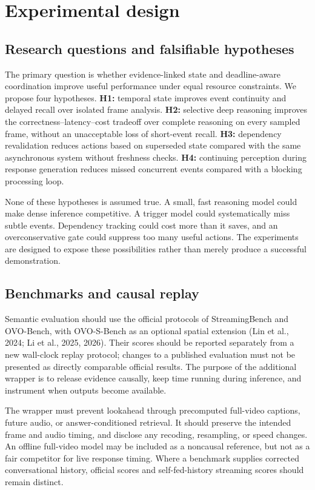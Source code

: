 \documentclass[11pt,letterpaper]{article}
\begin{document}
\section{Experimental design}
\subsection{Research questions and falsifiable hypotheses}
The primary question is whether evidence-linked state and deadline-aware coordination improve useful performance under equal resource constraints. We propose four hypotheses. \textbf{H1:} temporal state improves event continuity and delayed recall over isolated frame analysis. \textbf{H2:} selective deep reasoning improves the correctness--latency--cost tradeoff over complete reasoning on every sampled frame, without an unacceptable loss of short-event recall. \textbf{H3:} dependency revalidation reduces actions based on superseded state compared with the same asynchronous system without freshness checks. \textbf{H4:} continuing perception during response generation reduces missed concurrent events compared with a blocking processing loop.

None of these hypotheses is assumed true. A small, fast reasoning model could make dense inference competitive. A trigger model could systematically miss subtle events. Dependency tracking could cost more than it saves, and an overconservative gate could suppress too many useful actions. The experiments are designed to expose these possibilities rather than merely produce a successful demonstration.

\subsection{Benchmarks and causal replay}
Semantic evaluation should use the official protocols of StreamingBench and OVO-Bench, with OVO-S-Bench as an optional spatial extension (Lin et al., 2024; Li et al., 2025, 2026). Their scores should be reported separately from a new wall-clock replay protocol; changes to a published evaluation must not be presented as directly comparable official results. The purpose of the additional wrapper is to release evidence causally, keep time running during inference, and instrument when outputs become available.

The wrapper must prevent lookahead through precomputed full-video captions, future audio, or answer-conditioned retrieval. It should preserve the intended frame and audio timing, and disclose any recoding, resampling, or speed changes. An offline full-video model may be included as a noncausal reference, but not as a fair competitor for live response timing. Where a benchmark supplies corrected conversational history, official scores and self-fed-history streaming scores should remain distinct.
\end{document}
